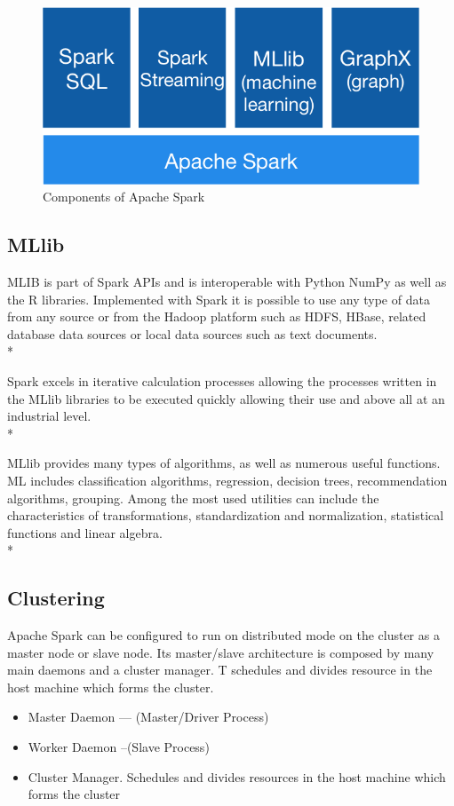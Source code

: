 \begin{figure}[h]
	\centering
	\includegraphics[scale=0.65]{figs/spark-components.png}
	\caption{Components of Apache Spark}
	\label{fig:components-spark}
\end{figure}

\subsection{MLlib}

MLIB is part of Spark APIs and is interoperable with Python NumPy as well as the R libraries. Implemented with Spark it is possible to use any type of data from any source or from the Hadoop platform such as HDFS, HBase, related database data sources or local data sources such as text documents.\\*

Spark excels in iterative calculation processes allowing the processes written in the MLlib libraries to be executed quickly allowing their use and above all at an industrial level.\\*

MLlib provides many types of algorithms, as well as numerous useful functions. ML includes classification algorithms, regression, decision trees, recommendation algorithms, grouping. Among the most used utilities can include the characteristics of transformations, standardization and normalization, statistical functions and linear algebra.\\*

\subsection{Clustering}



Apache Spark can be configured to run on distributed mode on the cluster as a master node or slave node. Its master/slave architecture is composed by many main daemons and a cluster manager. T schedules and divides resource in the host machine which forms the cluster. 
\begin{itemize}

	\item Master Daemon — (Master/Driver Process)
	\item Worker Daemon –(Slave Process)
	\item Cluster Manager. Schedules and divides resources in the host machine which forms the cluster
\end{itemize}

